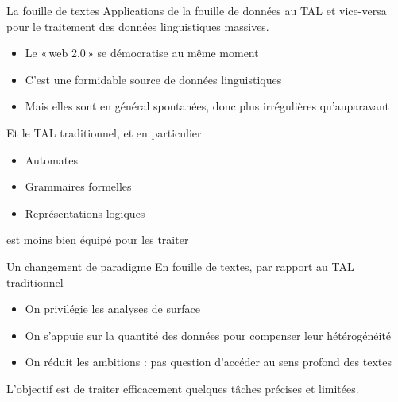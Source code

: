 \documentclass[hyperref={unicode}, xcolor={svgnames}, french]{beamer}
\begin{document}
\begin{frame}{La fouille de textes}
    Applications de la fouille de données au \alert{TAL} et vice-versa pour le traitement des données linguistiques massives.

    \begin{itemize}
        \item Le « web 2.0 » se démocratise au même moment
        \item C'est une formidable source de données linguistiques
        \item Mais elles sont en général spontanées, donc plus \alert{irrégulières} qu'auparavant
    \end{itemize}

    Et le TAL traditionnel, et en particulier
    \begin{itemize}
        \item Automates
        \item Grammaires formelles
        \item Représentations logiques
    \end{itemize}
    est moins bien équipé pour les traiter
\end{frame}

\begin{frame}{Un changement de paradigme}
    En fouille de textes, par rapport au TAL traditionnel
    \begin{itemize}
        \item On privilégie les \alert{analyses de surface}
        \item On s'appuie sur la \alert{quantité des données} pour compenser leur hétérogénéité
        \item On réduit les ambitions : pas question d'accéder au sens profond des textes
    \end{itemize}

    L'objectif est de traiter efficacement quelques \alert{tâches} précises et limitées.
\end{frame}
\end{document}
